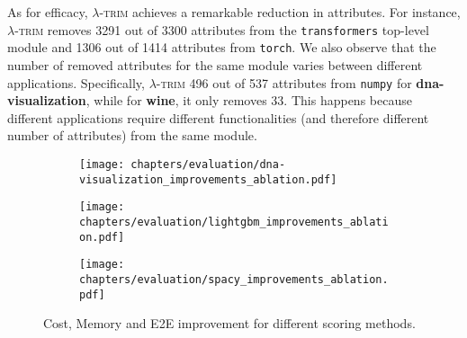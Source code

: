 \documentclass[sigplan,nonacm]{acmart}
\newcommand{\sys}{\textsc{\ensuremath{\lambda}-trim}\xspace}
\newcommand{\application}[1]{{\textcolor{pennblue}{\textbf{#1}}}}
\newcommand{\module}[1]{{\texttt{#1}}}
\begin{document}
As for efficacy, \sys achieves a remarkable reduction in attributes.
For instance, \sys removes 3291 out of 3300 attributes from the \module{transformers} top-level module and 1306 out of 1414 attributes from \module{torch}.
We also observe that the number of removed attributes for the same module varies between different applications.
Specifically, \sys 496 out of 537 attributes from \module{numpy} for \application{dna-visualization}, while for \application{wine}, it only removes 33.
This happens because different applications require different functionalities (and therefore different number of attributes) from the same module.




\begin{figure}[t]
    \centering
\begin{subfigure}[b]{\linewidth}
        \centering
        \texttt{[image: chapters/evaluation/dna-visualization\_improvements\_ablation.pdf]}
        \label{fig:sub1}
    \end{subfigure}



\begin{subfigure}[b]{\linewidth}
        \centering
        \texttt{[image: chapters/evaluation/lightgbm\_improvements\_ablation.pdf]}
        \label{fig:sub2}
    \end{subfigure}



\begin{subfigure}[b]{\linewidth}
        \centering
        \texttt{[image: chapters/evaluation/spacy\_improvements\_ablation.pdf]}
    \end{subfigure}
    
    \caption{Cost, Memory and E2E improvement for different scoring methods.}
    \label{fig:ablation}
\end{figure}
\end{document}
